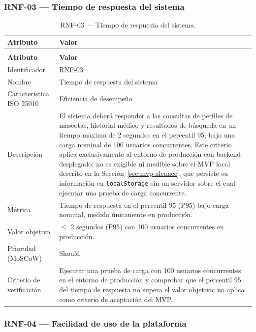 \documentclass[journal,onecolumn]{IEEEtran}
\makeatletter
\newenvironment{atributos}[2]{%
	\small
	\begin{longtable}{@{}>{\raggedright\arraybackslash}p{4.2cm} >{\raggedright\arraybackslash}p{11.2cm}@{}}
		\caption{#2}\label{tab:#1}\\
		\toprule
		\textbf{Atributo} & \textbf{Valor} \\
		\midrule
		\endfirsthead
		\multicolumn{2}{@{}l}{\small\itshape (continuación)}\\
		\toprule
		\textbf{Atributo} & \textbf{Valor} \\
		\midrule
		\endhead
		\bottomrule
		\endlastfoot
	}{%
	\end{longtable}
	\normalsize
}
\makeatother
\begin{document}
	
	\subsubsection{RNF-03 --- Tiempo de respuesta del sistema}
	
	\begin{atributos}{RNF-03}{RNF-03 --- Tiempo de respuesta del sistema.}
		Identificador & \hyperref[tab:RNF-03]{RNF-03} \\
		Nombre & Tiempo de respuesta del sistema \\
		Característica ISO 25010 & Eficiencia de desempeño \\
		Descripción & El sistema deberá responder a las consultas de perfiles de mascotas, historial médico y resultados de búsqueda en un tiempo máximo de 2 segundos en el percentil 95, bajo una carga nominal de 100 usuarios concurrentes. Este criterio aplica exclusivamente al entorno de producción con backend desplegado; no es exigible ni medible sobre el MVP local descrito en la Sección~\ref{sec:mvp-alcance}, que persiste su información en \texttt{localStorage} sin un servidor sobre el cual ejecutar una prueba de carga concurrente. \\
		Métrica & Tiempo de respuesta en el percentil 95 (P95) bajo carga nominal, medido únicamente en producción. \\
		Valor objetivo & $\leq$ 2 segundos (P95) con 100 usuarios concurrentes en producción. \\
		Prioridad (MoSCoW) & Should \\
		Criterio de verificación & Ejecutar una prueba de carga con 100 usuarios concurrentes en el entorno de producción y comprobar que el percentil 95 del tiempo de respuesta no supera el valor objetivo; no aplica como criterio de aceptación del MVP. \\
	\end{atributos}
	
	
	\subsubsection{RNF-04 --- Facilidad de uso de la plataforma}
	
\end{document}
